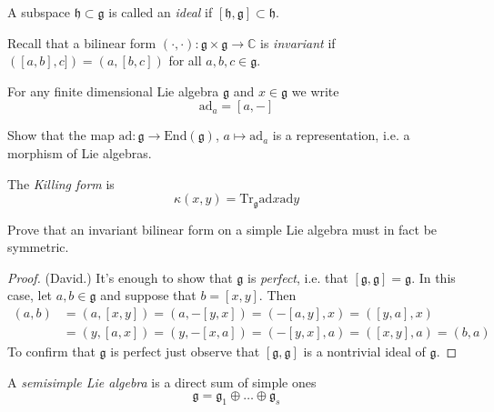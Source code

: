 \begin{definition}
\label{definition-ideal}
A subspace $\mathfrak{h}\subset \mathfrak{g}$ is called an {\it ideal} if
$[\mathfrak{h},\mathfrak{g}]\subset\mathfrak{h}$.
\end{definition}

\medskip\noindent
Recall that a bilinear form
$(\cdot,\cdot):\mathfrak{g}\times\mathfrak{g}\to \mathbb{C}$ is {\it invariant}
if $([a,b],c])=(a,[b,c])$ for all  $a,b,c \in \mathfrak{g}$.

\begin{definition}
\label{definition-ad}
For any finite dimensional Lie algebra  $\mathfrak{g}$ and $x \in \mathfrak{g}$
we write
$$
\text{ad}_a=[a,-]
$$
\end{definition}

\begin{exercise}
\label{exercise-adjoint-representation}
Show that the map $\text{ad}:\mathfrak{g}\to \text{End}(\mathfrak{g})$,
$a \mapsto \text{ad}_a$ is a representation, 
i.e. a morphism of Lie algebras.
\end{exercise}

\begin{definition}
\label{definition-Killing-form}
The {\it Killing form} is
$$
\kappa(x,y)=\text{Tr}_{\mathfrak{g}}\text{ad}x\text{ad}y
$$
\end{definition}

\begin{exercise}
\label{exercise-invariant-bilinear-form-on-simple-Lie-algebra-is-symmetric}
Prove that an invariant bilinear form on a simple Lie algebra must in fact be
symmetric.
\end{exercise}

\begin{proof}
(David.) It's enough to show that $\mathfrak{g}$ is
{\it perfect}, i.e. that $[\mathfrak{g},\mathfrak{g}]=\mathfrak{g}$. In this
case, let $a,b \in \mathfrak{g}$ and suppose that $b=[x,y]$. Then
\begin{align*}
(a,b)&=(a,[x,y])=(a,-[y,x])=(-[a,y],x)=([y,a],x)\\
&=(y,[a,x])=(y,-[x,a])=(-[y,x],a)=([x,y],a)=(b,a)
\end{align*}
To confirm that $\mathfrak{g}$ is perfect just observe that
$[\mathfrak{g},\mathfrak{g}]$ is a nontrivial ideal of $\mathfrak{g}$.
\end{proof}

\begin{definition}
\label{definition-semisimple-Lie-algebra}
A {\it semisimple Lie algebra} is a direct sum of simple ones
$$
\mathfrak{g}=\mathfrak{g}_1\oplus\ldots\oplus\mathfrak{g}_s
$$
\end{definition}

